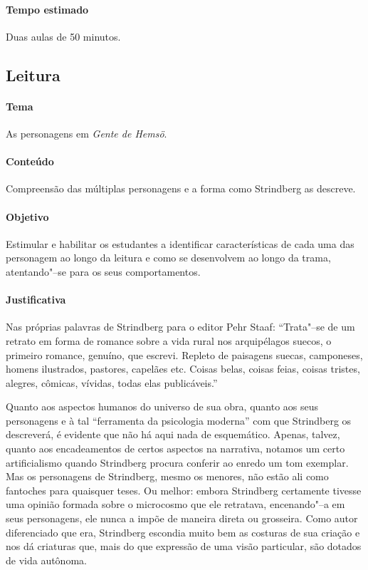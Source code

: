 \documentclass[12pt]{extarticle}
\begin{document}
\paragraph{Tempo estimado} Duas aulas de 50 minutos. 


\subsection{Leitura}

\paragraph{Tema} As personagens em \textit{Gente de Hemsö}.

\paragraph{Conteúdo} Compreensão das múltiplas personagens e a forma 
como Strindberg as descreve.

\paragraph{Objetivo} Estimular e habilitar os estudantes a identificar características 
de cada uma das personagem ao longo da leitura e como se desenvolvem ao 
longo da trama, atentando"--se para os seus comportamentos. 

\paragraph{Justificativa} Nas próprias palavras de Strindberg para o editor 
Pehr Staaf: ``Trata"--se de um retrato em forma de romance sobre a vida 
rural nos arquipélagos suecos, o primeiro romance, genuíno, que escrevi.
Repleto de paisagens suecas, camponeses, homens ilustrados,
pastores, capelães etc. Coisas belas, coisas feias, coisas tristes,
alegres, cômicas, vívidas, todas elas publicáveis.''

Quanto aos aspectos humanos do universo de sua obra, quanto
aos seus personagens e à tal “ferramenta da psicologia moderna”
com que Strindberg os descreverá, é evidente que
não há aqui nada de esquemático. Apenas, talvez, quanto
aos encadeamentos de certos aspectos na narrativa, notamos
um certo artificialismo quando Strindberg procura conferir
ao enredo um tom exemplar. Mas os personagens de
Strindberg, mesmo os menores, não estão ali como fantoches para quaisquer 
teses. Ou melhor: embora Strindberg certamente tivesse uma opinião formada 
sobre o microcosmo que ele retratava, encenando"--a em seus personagens,
ele nunca a impõe de maneira direta ou grosseira. Como
autor diferenciado que era, Strindberg escondia muito bem
as costuras de sua criação e nos dá criaturas que, mais do
que expressão de uma visão particular, são dotados de vida
autônoma.
\end{document}
